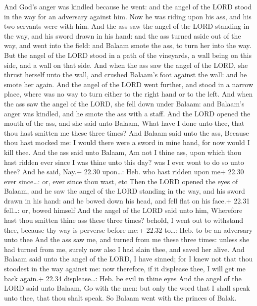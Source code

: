  And God's anger was kindled because he went: and the
angel of the LORD stood in the way for an adversary against him. Now he
was riding upon his ass, and his two servants were with him.
 And the ass saw the angel of the LORD standing in the way,
and his sword drawn in his hand: and the ass turned aside out of the
way, and went into the field: and Balaam smote the ass, to turn her into
the way.  But the angel of the LORD stood in a path of the
vineyards, a wall being on this side, and a wall on that side.
 And when the ass saw the angel of the LORD, she thrust
herself unto the wall, and crushed Balaam's foot against the wall: and
he smote her again.  And the angel of the LORD went
further, and stood in a narrow place, where was no way to turn either to
the right hand or to the left.  And when the ass saw the
angel of the LORD, she fell down under Balaam: and Balaam's anger was
kindled, and he smote the ass with a staff.  And the LORD
opened the mouth of the ass, and she said unto Balaam, What have I done
unto thee, that thou hast smitten me these three times? 
And Balaam said unto the ass, Because thou hast mocked me: I would there
were a sword in mine hand, for now would I kill thee.  And
the ass said unto Balaam, Am not I thine ass, upon which thou hast
ridden ever since I was thine unto this day? was I ever wont to do so
unto thee? And he said, Nay.+ 22.30 upon\ldots: Heb. who hast ridden
upon me+ 22.30 ever since\ldots: or, ever since thou wast, etc
 Then the LORD opened the eyes of Balaam, and he saw the
angel of the LORD standing in the way, and his sword drawn in his hand:
and he bowed down his head, and fell flat on his face.+ 22.31
fell\ldots: or, bowed himself  And the angel of the LORD
said unto him, Wherefore hast thou smitten thine ass these three times?
behold, I went out to withstand thee, because thy way is perverse before
me:+ 22.32 to\ldots: Heb. to be an adversary unto thee  And
the ass saw me, and turned from me these three times: unless she had
turned from me, surely now also I had slain thee, and saved her alive.
 And Balaam said unto the angel of the LORD, I have sinned;
for I knew not that thou stoodest in the way against me: now therefore,
if it displease thee, I will get me back again.+ 22.34 displease\ldots:
Heb. be evil in thine eyes  And the angel of the LORD said
unto Balaam, Go with the men: but only the word that I shall speak unto
thee, that thou shalt speak. So Balaam went with the princes of Balak.

